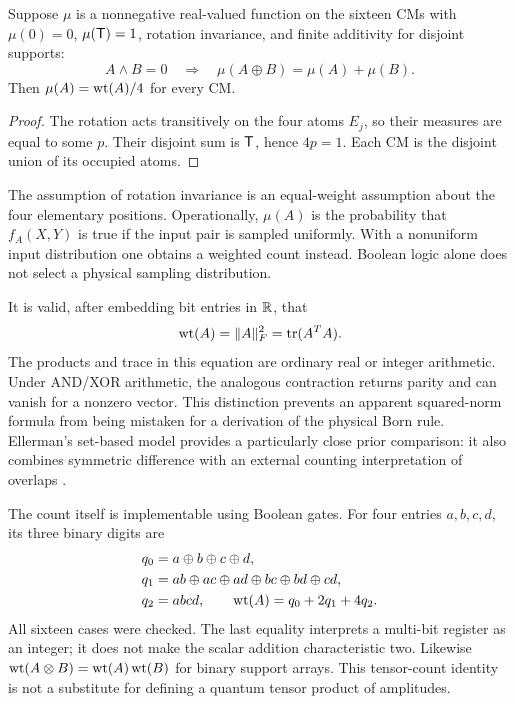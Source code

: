 \begin{theorem}\label{thm:measure}
Suppose $\mu$ is a nonnegative real-valued function on the sixteen CMs with $\mu(0)=0$, $\mu(\mathsf T)=1$, rotation invariance, and finite additivity for disjoint supports:
\begin{equation}
 A\land B=0\quad\Longrightarrow\quad
 \mu(A\oplus B)=\mu(A)+\mu(B).
\end{equation}
Then $\mu(A)=\operatorname{wt}(A)/4$ for every CM.
\end{theorem}
\begin{proof}
The rotation acts transitively on the four atoms $E_j$, so their measures are equal to some $p$. Their disjoint sum is $\mathsf T$, hence $4p=1$. Each CM is the disjoint union of its occupied atoms.
\end{proof}
The assumption of rotation invariance is an equal-weight assumption about the four elementary positions. Operationally, $\mu(A)$ is the probability that $f_A(X,Y)$ is true if the input pair is sampled uniformly. With a nonuniform input distribution one obtains a weighted count instead. Boolean logic alone does not select a physical sampling distribution.

It is valid, after embedding bit entries in $\mathbb R$, that
\begin{equation}
 \operatorname{wt}(A)=\|A\|_F^2=\operatorname{tr}(A^TA).
\end{equation}
The products and trace in this equation are ordinary real or integer arithmetic. Under AND/XOR arithmetic, the analogous contraction returns parity and can vanish for a nonzero vector. This distinction prevents an apparent squared-norm formula from being mistaken for a derivation of the physical Born rule. Ellerman's set-based model provides a particularly close prior comparison: it also combines symmetric difference with an external counting interpretation of overlaps \cite{ellerman}.

The count itself is implementable using Boolean gates. For four entries $a,b,c,d$, its three binary digits are
\begin{align}
 q_0&=a\oplus b\oplus c\oplus d,\\
 q_1&=ab\oplus ac\oplus ad\oplus bc\oplus bd\oplus cd,\\
 q_2&=abcd,\qquad \operatorname{wt}(A)=q_0+2q_1+4q_2.
\end{align}
All sixteen cases were checked. The last equality interprets a multi-bit register as an integer; it does not make the scalar addition characteristic two. Likewise $\operatorname{wt}(A\otimes B)=\operatorname{wt}(A)\operatorname{wt}(B)$ for binary support arrays. This tensor-count identity is not a substitute for defining a quantum tensor product of amplitudes.

